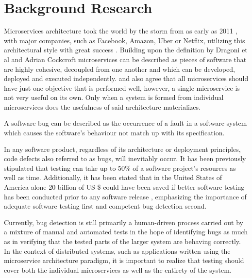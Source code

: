 \chapter{Background Research}\label{chp:background-research}
Microservices architecture took the world by the storm from as early as 2011 \cite{fowlerOnMicroservices}, with major companies, such as Facebook, Amazon, Uber or Netflix, utilizing this architectural style with great success \cite{uberSuccessWithMs} \cite{netflixBestPracticesMs}. 
Building upon the definition by Dragoni et al \cite{dragoniOnMs} and Adrian Cockcroft \cite{understandingOfMicroservices} microservices can be described as pieces of software that are highly cohesive, decoupled from one another and which can be developed, deployed and executed independently. \cite{dragoniOnMs} and \cite{understandingOfMicroservices} also agree that all microservices should have just one objective that is performed well, however, a single microservice is not very useful on its own. Only when a system is formed from individual microservices does the usefulness of said architecture materializes.

A software bug can be described as the occurrence of a fault in a software system which causes the software's behaviour not match up with its specification\cite{predicting-severity-of-a-bug}.
  
In any software product, regardless of its architecture or deployment principles, code defects also referred to as bugs, will inevitably occur. It has been previously stipulated that testing can take up to 50\% of a software project's resources as well as time. Additionally, it has been stated that in the United States of America alone 20 billion of US \$ could have been saved if better software testing has been conducted prior to any software release \cite{auto-bug-fixing}, emphasizing the importance of adequate software testing first and competent bug detection second.

Currently, bug detection is still primarily a human-driven process carried out by a mixture of manual and automated tests in the hope of identifying bugs as much as in verifying that the tested parts of the larger system are behaving correctly. 
In the context of distributed systems, such as applications written using the microservice architecture paradigm, it is important to realize that testing should cover both the individual microservices as well as the entirety of the system.


